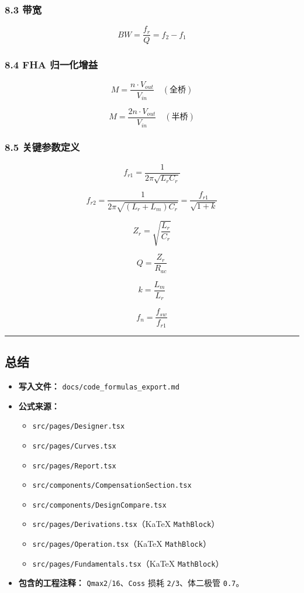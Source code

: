 \documentclass[UTF8]{ctexart}
\begin{document}
\subsubsection*{8.3 带宽}

\[
BW = \frac{f_r}{Q} = f_2 - f_1
\]

\subsubsection*{8.4 FHA 归一化增益}

\[
M = \frac{n \cdot V_{out}}{V_{in}} \quad (\text{全桥})
\]

\[
M = \frac{2n \cdot V_{out}}{V_{in}} \quad (\text{半桥})
\]

\subsubsection*{8.5 关键参数定义}

\[
f_{r1} = \frac{1}{2\pi\sqrt{L_r C_r}}
\]

\[
f_{r2} = \frac{1}{2\pi\sqrt{(L_r + L_m) C_r}} = \frac{f_{r1}}{\sqrt{1 + k}}
\]

\[
Z_r = \sqrt{\frac{L_r}{C_r}}
\]

\[
Q = \frac{Z_r}{R_{ac}}
\]

\[
k = \frac{L_m}{L_r}
\]

\[
f_n = \frac{f_{sw}}{f_{r1}}
\]

\noindent\rule{\textwidth}{0.4pt}

\subsection*{总结}

\begin{itemize}
\item \textbf{写入文件：} \texttt{docs/code\_formulas\_export.md}
\item \textbf{公式来源：}
\begin{itemize}
\item \texttt{src/pages/Designer.tsx}
\item \texttt{src/pages/Curves.tsx}
\item \texttt{src/pages/Report.tsx}
\item \texttt{src/components/CompensationSection.tsx}
\item \texttt{src/components/DesignCompare.tsx}
\item \texttt{src/pages/Derivations.tsx}（KaTeX \texttt{MathBlock}）
\item \texttt{src/pages/Operation.tsx}（KaTeX \texttt{MathBlock}）
\item \texttt{src/pages/Fundamentals.tsx}（KaTeX \texttt{MathBlock}）
\end{itemize}
\item \textbf{包含的工程注释：} \texttt{Qmax2}/\texttt{16}、\texttt{Coss} 损耗 \texttt{2/3}、体二极管 \texttt{0.7}。
\end{itemize}
\end{document}
